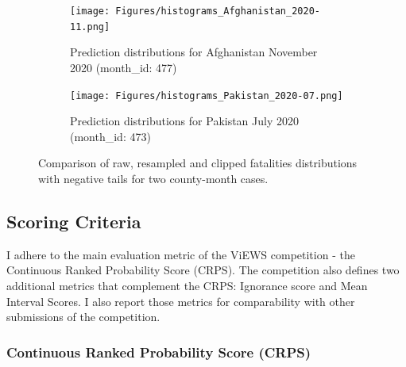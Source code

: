 \documentclass[runningheads]{llncs}
\begin{document}
    \begin{figure}[htbp]
        \centering

        \begin{subfigure}[b]{\textwidth}
            \centering
            \texttt{[image: Figures/histograms\_Afghanistan\_2020-11.png]}
            \caption{Prediction distributions for Afghanistan November 2020 (month\_id: 477)}
            \label{fig:histograms_Afghanistan}
        \end{subfigure}

        \vspace{1em} %

        \begin{subfigure}[b]{\textwidth}
            \centering
            \texttt{[image: Figures/histograms\_Pakistan\_2020-07.png]} %
            \caption{Prediction distributions for Pakistan July 2020 (month\_id: 473)}
            \label{fig:histograms_Pakistan}
        \end{subfigure}

        \caption{Comparison of raw, resampled and clipped fatalities distributions with negative tails for two county-month cases. }
        \label{fig:dist_comp}
    \end{figure}





    \subsection{Scoring Criteria}
    I adhere to the main evaluation metric of the ViEWS competition - the Continuous Ranked Probability Score (CRPS). The competition also defines two additional metrics that complement the CRPS: Ignorance score and Mean Interval Scores. I also report those metrics for comparability with other submissions of the competition.

    \subsubsection{Continuous Ranked Probability Score (CRPS)}
\end{document}
